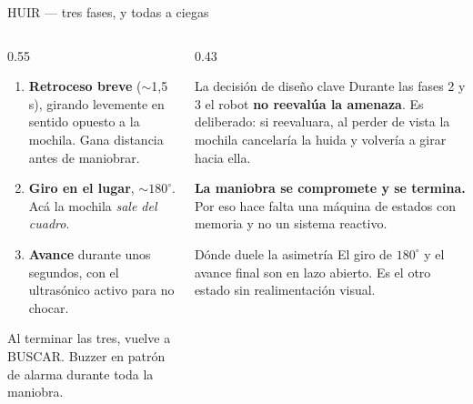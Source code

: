 \documentclass[aspectratio=169,10pt]{beamer}
\begin{document}
\begin{frame}{HUIR --- tres fases, y todas a ciegas}
  \begin{columns}[T,onlytextwidth]
    \begin{column}{0.55\textwidth}
      \begin{enumerate}\small
        \item \textbf{Retroceso breve} ($\sim$1,5 s), girando levemente en
              sentido opuesto a la mochila. Gana distancia antes de maniobrar.
        \item \textbf{Giro en el lugar}, $\sim180^\circ$. Acá la mochila
              \emph{sale del cuadro}.
        \item \textbf{Avance} durante unos segundos, con el ultrasónico activo
              para no chocar.
      \end{enumerate}
      \vspace{0.4em}
      Al terminar las tres, vuelve a BUSCAR. Buzzer en patrón de alarma durante
      toda la maniobra.
    \end{column}
    \begin{column}{0.43\textwidth}
      \begin{alertblock}{La decisión de diseño clave}
        \small
        Durante las fases 2 y 3 el robot \textbf{no reevalúa la amenaza}. Es
        deliberado: si reevaluara, al perder de vista la mochila cancelaría la
        huida y volvería a girar hacia ella.
        \vspace{0.4em}

        \textbf{La maniobra se compromete y se termina.} Por eso hace falta una
        máquina de estados con memoria y no un sistema reactivo.
      \end{alertblock}
      \begin{block}{Dónde duele la asimetría}
        \small
        El giro de $180^\circ$ y el avance final son en lazo abierto. Es el otro
        estado sin realimentación visual.
      \end{block}
    \end{column}
  \end{columns}
\end{frame}
\end{document}
